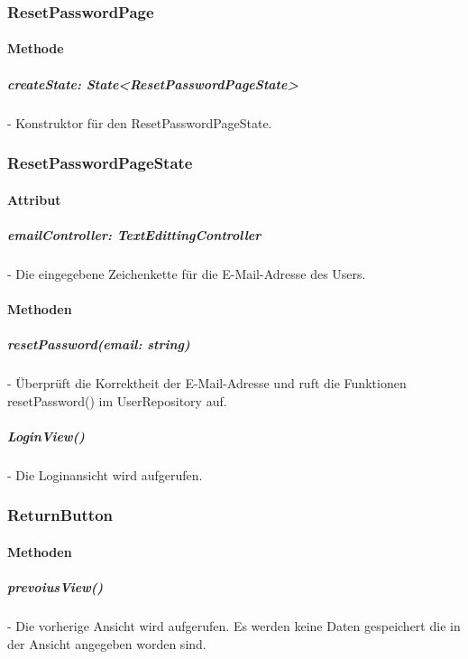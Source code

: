 \documentclass[parskip=full]{scrartcl}
\begin{document}
    \subsubsection{ResetPasswordPage}
        \paragraph*{Methode}
            \subparagraph*{createState: State<ResetPasswordPageState>} - Konstruktor für den ResetPasswordPageState.
    
    \subsubsection{ResetPasswordPageState}
        \paragraph*{Attribut}
            \subparagraph*{emailController: TextEdittingController} - Die eingegebene Zeichenkette für die E-Mail-Adresse des Users.
    
        \paragraph*{Methoden}
            \subparagraph*{resetPassword(email: string)} - Überprüft die Korrektheit der E-Mail-Adresse und ruft die Funktionen resetPassword() im UserRepository auf.
            \subparagraph*{LoginView()} - Die Loginansicht wird aufgerufen.

    \subsubsection{ReturnButton} \label{sec:ReturnButton} 
        \paragraph*{Methoden}
            \subparagraph*{prevoiusView()} - Die vorherige Ansicht wird aufgerufen. Es werden keine Daten gespeichert die in der Ansicht angegeben worden sind.
    
\end{document}
